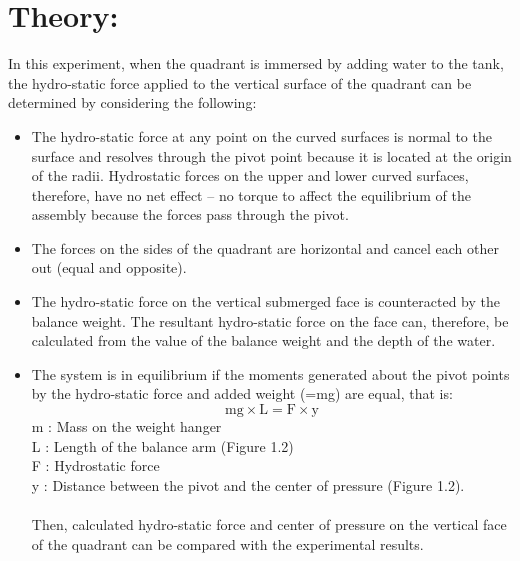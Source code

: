 \documentclass[12pt,a4paper]{article}
\begin{document}
\section{Theory:}
In this experiment, when the quadrant is immersed by adding water to the tank, the hydro-static force applied to the vertical surface of the quadrant can be determined by considering the following:
\begin{itemize}
\item The hydro-static force at any point on the curved surfaces is normal to the surface and resolves through the pivot point because it is located at the origin of the radii. Hydrostatic forces on the upper and lower curved surfaces, therefore, have no net effect – no torque to affect the equilibrium of the assembly because the forces pass through the pivot.
\item The forces on the sides of the quadrant are horizontal and cancel each other out (equal and opposite).
\item The hydro-static force on the vertical submerged face is counteracted by the balance weight. The resultant hydro-static force on the face can, therefore, be calculated from the value of the balance weight and the depth of the water.
\item The system is in equilibrium if the moments generated about the pivot points by the hydro-static force and added weight (=mg) are equal, that is:
\begin{equation}
	\text{mg} \times \text{L} = \text{F} \times \text{y}
\end{equation}
m : Mass on the weight hanger\\
L : Length of the balance arm (Figure 1.2)\\
F : Hydrostatic force\\
y : Distance between the pivot and the center of pressure (Figure 1.2).\\
\\Then, calculated hydro-static force and center of pressure on the vertical face of the quadrant can be compared with the experimental results.\\
\end{itemize}
\end{document}
